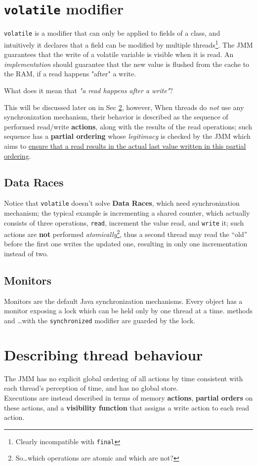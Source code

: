 \section{\texttt{volatile} modifier}
\lstinline|volatile| is a modifier that can only be applied to fields of a class,
and intuitively it declares that a field can be modified by multiple threads\footnote{Clearly incompatible with \lstinline|final|}.
The JMM guarantees that the write of a volatile variable is visible when it is read.
An \textit{implementation} should guarantee that the new value is flushed from the cache to the RAM, if a read happens "after" a write.

\begin{center}
   What does it mean that \textit{"a read happens after a write"}?
\end{center}
This will be discussed later on in Sec \ref{sec:behaviour_actions}, however,
When threads do \textit{not} use any synchronization mechanism,
their behavior is described as the sequence of performed read/write \textbf{actions},
along with the results of the read operations;
such sequence has a \textbf{partial ordering} whose \textit{legitimacy} is checked by the JMM
which aims to \ul{ensure that a read results in the actual last value written in this partial ordering}.

\subsection{Data Races}
Notice that \lstinline|volatile| doesn't solve \textbf{Data Races}, which need synchronization mechanism;
the typical example is incrementing a shared counter, which actually consists of three operations, \texttt{read}, increment the value read, and \texttt{write} it;
such actions are \textbf{not} performed \textit{atomically}\footnote{So\dots which operations are atomic and which are not?},
thus a second thread may read the ``old'' before the first one writes the updated one, 
resulting in only one incrementation instead of two.

\subsection{Monitors}
Monitors are the default Java synchronization mechanisms.
Every object has a monitor exposing a lock which can be held only by one thread at a time.
methods and \dots with the \lstinline|synchronized| modifier are guarded by the lock.

\section{Describing thread behaviour}
\label{sec:behaviour_actions}
The JMM has no explicit global ordering of all actions by time consistent with each thread's perception of time, and has no global store.\\
Executions are instead described in terms of memory \textbf{actions},
\textbf{partial orders} on these actions, and a \textbf{visibility function} that assigns a write action to each read action.

